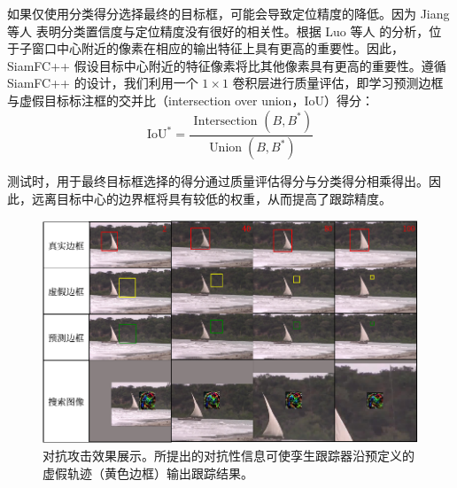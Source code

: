 如果仅使用分类得分选择最终的目标框，可能会导致定位精度的降低。因为 Jiang 等人 \cite{IoU-Net} 表明分类置信度与定位精度没有很好的相关性。根据 Luo 等人 \cite{ERF} 的分析，位于子窗口中心附近的像素在相应的输出特征上具有更高的重要性。因此，SiamFC++ 假设目标中心附近的特征像素将比其他像素具有更高的重要性。遵循 SiamFC++ 的设计，我们利用一个 $1 \times 1$ 卷积层进行质量评估，即学习预测边框与虚假目标标注框的交并比（intersection over union，IoU）得分：
\begin{equation}
\mathrm{IoU}^{*}=\frac{\text { Intersection }\left(B, B^{*}\right)}{\operatorname{Union}\left(B, B^{*}\right)}
\end{equation}

测试时，用于最终目标框选择的得分通过质量评估得分与分类得分相乘得出。因此，远离目标中心的边界框将具有较低的权重，从而提高了跟踪精度。

\begin{figure}[t]
\centering
\includegraphics[width=1.0\textwidth]{Img/attack/vis_v4.pdf}
\caption{对抗攻击效果展示。所提出的对抗性信息可使孪生跟踪器沿预定义的虚假轨迹（黄色边框）输出跟踪结果。}
\label{fig:attack_vis}
\end{figure}

